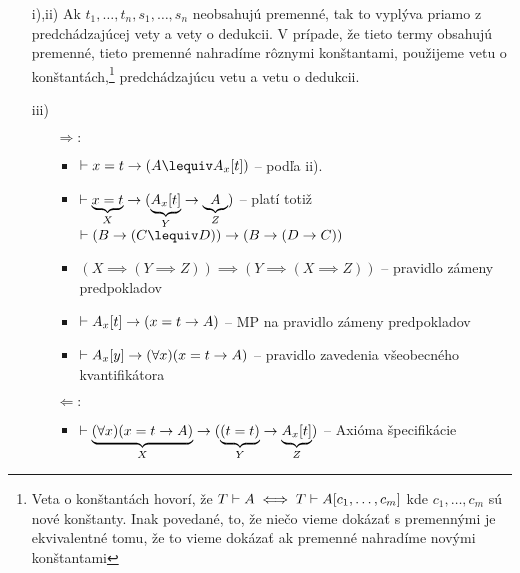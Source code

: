 \begin{dokaz}
    \noindent
    \begin{itemize}
        \item[i),ii)] Ak $t_1,\dots,t_n,s_1,\dots,s_n$ neobsahujú
            premenné, tak to vyplýva priamo z predchádzajúcej vety a vety
            o dedukcii. V prípade, že tieto termy obsahujú premenné,
            tieto premenné nahradíme rôznymi konštantami, použijeme
            vetu o konštantách,\footnote{Veta o konštantách hovorí, že
            $T \vdash A \iff T \vdash A[c_1,\dots,c_m]$ kde
            $c_1,\dots,c_m$ sú nové konštanty. Inak povedané,
            to, že niečo vieme dokázať s premennými je ekvivalentné
            tomu, že to vieme dokázať ak premenné nahradíme novými
            konštantami} predchádzajúcu vetu a vetu o dedukcii.
        \item[iii)]
            \begin{itemize}
            \item[$\Rightarrow:$]
                \begin{itemize}
                \item $\provable x=t \implies (A \lequiv
                    A_x[t])$ -- podľa ii).
                \item $\vdash \underbrace{x=t}_X \rightarrow (
                    \underbrace{A_x[t]}_Y \rightarrow
                    \underbrace{A}_Z)$ -- platí totiž
                    $\provable (B \implies (C \lequiv D))
                    \implies (B \implies (D \implies C))$
                \item $(X \implies (Y \implies Z)) \implies
                       (Y \implies (X \implies Z))$ -- pravidlo zámeny
                       predpokladov
                \item $\vdash A_x[t] \rightarrow (x=t \rightarrow A)$ --
                    MP na pravidlo zámeny predpokladov
                \item $\vdash A_x[y] \rightarrow (\forall x)(x=t
                    \rightarrow A)$ -- pravidlo zavedenia všeobecného
                    kvantifikátora
                \end{itemize}

            \item[$\Leftarrow:$]
                \begin{itemize}
                \item $\vdash \underbrace{(\forall x)(x=t \rightarrow
                    A)}_X \rightarrow
                        (\underbrace{(t=t)}_Y \rightarrow
                        \underbrace{A_x[t]}_Z)$ -- Axióma špecifikácie


\end{itemize}
\end{itemize}
\end{itemize}
\end{dokaz}
